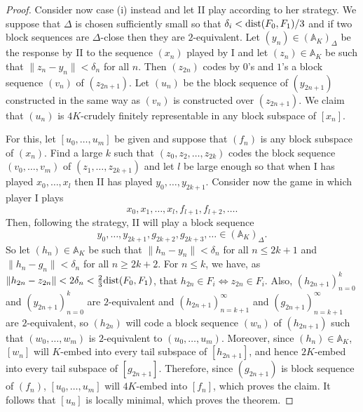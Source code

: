 \documentclass[10pt]{amsart}
\numberwithin{equation}{section}
\begin{document}
\begin{proof}
Consider now case (i) instead and let II play according to her strategy. We
suppose that $\Delta$ is chosen sufficiently small so that $\delta_i<{\rm
dist}(F_0,F_1)/3$ and if two block sequences are $\Delta$-close then they are
$2$-equivalent. Let $(y_n)\in ({\mathbb A}_K)_\Delta$ be the response by II to the
sequence $(x_n)$ played by I and let $(z_n)\in {\mathbb A}_K$ be such that
$\|z_n-y_n\|<\delta_n$ for all $n$. Then $(z_{2n})$ codes by $0$'s and $1$'s a
block sequence $(v_n)$ of $(z_{2n+1})$. Let $(u_n)$ be the block sequence of
$(y_{2n+1})$ constructed in the same way as $(v_n)$ is constructed over
$(z_{2n+1})$. We claim that $(u_n)$ is $4K$-crudely finitely representable in
any block subspace of $[x_n]$.

For this, let $[u_0,\ldots,u_m]$ be given and suppose that $(f_n)$ is any block
subspace of $(x_n)$. Find a large $k$ such that $(z_0,z_2,\ldots,z_{2k})$ codes
the block sequence $(v_0,\ldots, v_m)$ of $(z_1,\ldots,z_{2k+1})$ and let $l$
be large enough so that when I has played $x_0,\ldots, x_l$ then II has played
$y_0,\ldots, y_{2k+1}$. Consider now the game in which player I plays
$$
x_0,x_1,\ldots,x_l,f_{l+1},f_{l+2},\ldots.
$$
Then, following the strategy, II will play a block sequence
$$
y_0,\ldots, y_{2k+1},g_{2k+2},g_{2k+3},\ldots\in ({\mathbb A}_K)_\Delta.
$$
So let $(h_n)\in {\mathbb A}_K$ be such that  $\|h_n-y_n\|<\delta_n$ for all $n{\ensuremath{\leqslant}}
2k+1$ and $\|h_n-g_n\|<\delta_n$ for all $n{\ensuremath{\geqslant}} 2k+2$. For $n{\ensuremath{\leqslant}} k$, we have,
as $\|h_{2n}-z_{2n}\|<2\delta_n<\frac23{\rm dist}(F_0,F_1)$, that $h_{2n}\in
F_i{\Leftrightarrow} z_{2n}\in F_i$.  Also, $(h_{2n+1})_{n=0}^k$ and $(y_{2n+1})_{n=0}^k$
are $2$-equivalent and $(h_{2n+1})_{n=k+1}^\infty$ and
$(g_{2n+1})_{n=k+1}^\infty$ are $2$-equivalent, so $(h_{2n})$ will code a block
sequence $(w_n)$ of $(h_{2n+1})$ such that $(w_0,\ldots,w_m)$ is $2$-equivalent
to $(u_0,\ldots, u_m)$. Moreover, since $(h_n)\in {\mathbb A}_K$, $[w_n]$ will $K$-embed
into every tail subspace of $[h_{2n+1}]$, and hence $2K$-embed into every tail
subspace of $[g_{2n+1}]$. Therefore, since $(g_{2n+1})$ is block sequence of
$(f_n)$, $[u_0,\ldots,u_m]$ will $4K$-embed into $[f_n]$, which proves the
claim. It follows that $[u_n]$ is locally minimal, which proves the theorem.
\end{proof}
\end{document}
